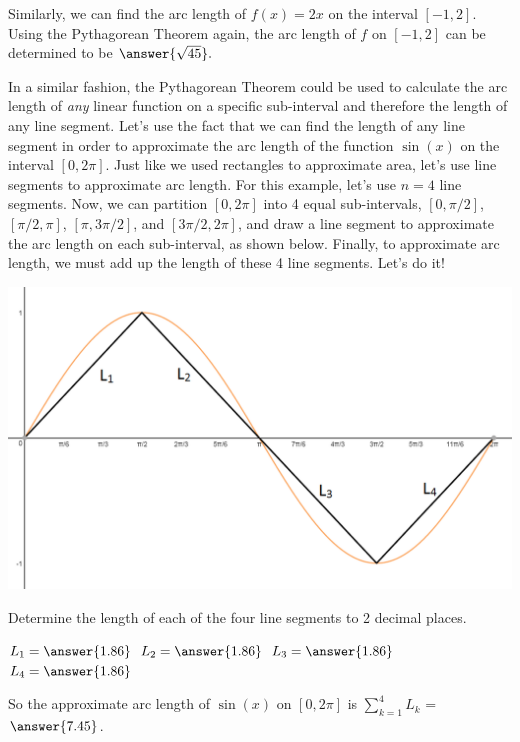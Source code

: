 \documentclass[handout,nooutcomes]{ximera}
\begin{document}
\begin{problem}
Similarly, we can find the arc length of $f(x)=2x$ on the interval $[-1,2].$  Using the Pythagorean Theorem again, the arc length of $f$ on $[-1,2]$ can be determined to be $\answer{\sqrt{45}}.$
\end{problem}

In a similar fashion, the Pythagorean Theorem could be used to calculate the arc length of \textit{any} linear function on a specific sub-interval and therefore the length of any line segment.  Let's use the fact that we can find the length of any line segment in order to approximate the arc length of the function $\sin(x)$ on the interval $[0, 2\pi]$.  Just like we used rectangles to approximate area, let's use line segments to approximate arc length.  For this example, let's use $n=4$ line segments.  Now, we can partition $[0, 2\pi]$ into 4 equal sub-intervals, $[0, \pi/2]$, $[\pi/2, \pi]$, $[\pi, 3\pi/2]$, and $[3\pi/2, 2\pi]$, and draw a line segment to approximate the arc length on each sub-interval, as shown below.  Finally, to approximate arc length, we must add up the length of these 4 line segments.  Let's do it! \\

\begin{center} \includegraphics{sinxsegments.png} \end{center}


\begin{problem}
Determine the length of each of the four line segments to 2 decimal places.

$L_1 = \answer{1.86}$
$L_2 = \answer{1.86}$
$L_3 = \answer{1.86}$
$L_4 = \answer{1.86}$

So the approximate arc length of $\sin(x)$ on $[0, 2\pi]$ is $\displaystyle\sum_{k=1}^4 L_k$ = $\answer{7.45}$.
\end{problem}
\end{document}
